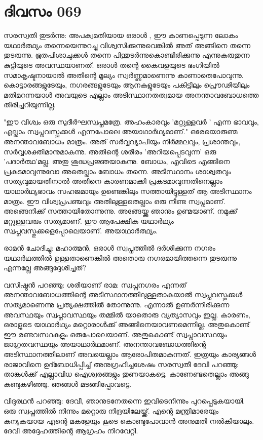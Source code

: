 \newpage
\section{ദിവസം 069}


സരസ്വതി തുടര്‍ന്നു: അപക്വമതിയായ ഒരാള്‍ , ഈ കാണപ്പെടുന്ന ലോകം യഥാര്‍ത്ഥ്യം തന്നെയെന്നുറച്ചു വിശ്വസിക്കുന്നുവെങ്കില്‍ അത്‌ അങ്ങിനെ തന്നെ തുടരുന്നു. ഭൂതപിശാചുക്കൾ തന്നെ പിന്തുടര്‍ന്നുകൊണ്ടിരിക്കുന്നു എന്നുകരുതുന്ന കുട്ടിയുടെ അവസ്ഥയാണത്‌. ഒരാള്‍ തന്റെ കൈവളയുടെ ഭംഗിയില്‍ സമാകൃഷ്ടനായാല്‍ അതിന്റെ മൂല്യം സ്വര്‍ണ്ണമാണെന്നു കാണാതെപോവുന്നു. കൊട്ടാരങ്ങളുടേയും, നഗരങ്ങളുടേയും ആനകളുടേയും പകിട്ടിലും പ്രൌഢിയിലും മതിമറന്നയാള്‍ അവയുടെ എല്ലാം അടിസ്ഥാനതത്വമായ അനന്താവബോധത്തെ തിരിച്ചറിയുന്നില്ല.

"ഈ വിശ്വം ഒരു സുദീര്‍ഘസ്വപ്നമത്രേ. അഹംകാരവും 'മറ്റുള്ളവര്‍ ' എന്ന ഭാവവും, എല്ലാം സ്വപ്നവസ്തുക്കള്‍ എന്നപോലെ അയാഥാര്‍ഥ്യമാണ്‌." ഒരേയൊരുണ്മ അനന്താവബോധം മാത്രം. അത്‌ സര്‍വ്വവ്യാപിയും നിര്‍മ്മലവും, പ്രശാന്തവും, സര്‍വ്വശക്തിമാനുമാകുന്നു. അതിന്റെ ശരീരം 'അറിയപ്പെടവുന്ന' ഒരു 'പദാര്‍ത്ഥ'മല്ല. അതു ശുദ്ധപ്രജ്ഞയാകുന്നു. ബോധം, എവിടെ എങ്ങിനെ  പ്രകടമാവുന്നുവോ അതെല്ലാം ബോധം തന്നെ. അടിസ്ഥാനം ശാശ്വതവും സത്യവുമായതിനാല്‍ അതിനെ കാരണമാക്കി പ്രകടമാവുന്നതിനെല്ലാം യാഥാര്‍ഥ്യഭാവം സഹജമായും ഉണ്ടെങ്കിലും സത്തായിട്ടുള്ളത്‌ ആ അടിസ്ഥാനം മാത്രം. ഈ വിശ്വപ്രപഞ്ചവും അതിലുള്ളതെല്ലാം ഒരു നീണ്ട സ്വപ്നമാണ്‌. അങ്ങെനിക്ക്‌ സത്തായിതോന്നുന്നു. അങ്ങേയ്ക്കു ഞാനും ഉണ്മയാണ്‌. നമുക്ക്‌ മറ്റുള്ളവരും സത്യമാണ്‌. ഈ ആപേക്ഷിക യഥാര്‍ഥ്യം സ്വപ്നവസ്തുക്കളെപ്പോലെയാണ്‌. അയാഥാർത്ഥ്യം.

രാമന്‍ ചോദിച്ചു: മഹാത്മന്‍, ഒരാള്‍ സ്വപ്നത്തില്‍ ദര്‍ശിക്കുന്ന നഗരം യഥാര്‍ഥത്തില്‍ ഉള്ളതാണെങ്കില്‍ അതൊരു നഗരമായിത്തന്നെ തുടരുന്നു എന്നല്ലേ അങ്ങുദ്ദേശിച്ചത്‌?

വസിഷ്ഠന്‍ പറഞ്ഞു: ശരിയാണ്‌ രാമ: സ്വപ്നനഗരം എന്നത്‌ അനന്താവബോധത്തിന്റെ അടിസ്ഥാനത്തിലുള്ളതാകയാല്‍ സ്വപ്നവസ്തുക്കള്‍ സത്യമാണെന്നു പ്രത്യക്ഷത്തില്‍ തോന്നുന്നു. എന്നാല്‍ ഉണര്‍ന്നിരിക്കുന്ന അവസ്ഥയും സ്വപ്നാവസ്ഥയും തമ്മില്‍ യാതൊരു വ്യത്യാസവും ഇല്ല. കാരണം, ഒരാളുടെ യാഥാര്‍ഥ്യം മറ്റൊരാള്‍ക്ക്‌ അങ്ങിനെയാവണമെന്നില്ല. അതുകൊണ്ട്‌ ഈ രണ്ടവസ്ഥകളും ഒരുപോലെയാണ്‌. അതുകൊണ്ട്‌ സ്വപ്നാവസ്ഥയും ജാഗ്രതവസ്ഥയും അയാഥാര്‍ഥമാണ്‌. അനന്താവബോധത്തിന്റെ  അടിസ്ഥാനത്തിലാണ്‌ അവയെല്ലാം ആരോപിതമാകുന്നത്‌. ഇത്രയും കാര്യങ്ങള്‍ രാജാവിനെ ഉദ്ബോധിപ്പിച്ച്‌ അനുഗ്രഹിച്ചശേഷം സരസ്വതീ ദേവി പറഞ്ഞു: താങ്കള്‍ക്ക്‌ എല്ലാവിധ ഐശ്വരങ്ങളും തുണയാകട്ടെ. കാണേണ്ടതെല്ലാം അങ്ങു കണ്ടുകഴിഞ്ഞു. ഞങ്ങൾ മടങ്ങിപ്പോവട്ടെ.

വിദുരഥന്‍ പറഞ്ഞു: ദേവീ, ഞാനുടനേതന്നെ ഇവിടെനിന്നും പുറപ്പെടുകയായി. ഒരു സ്വപ്നത്തില്‍ നിന്നും മറ്റൊരു നിദ്രയിലേയ്ക്ക്‌. എന്റെ മന്ത്രിമാരേയും കന്യകയായ എന്റെ മകളേയും കൂടെ കൊണ്ടുപോവാന്‍ അനുമതി നല്‍കിയാലും. ദേവി അദ്ദേഹത്തിന്റെ ആഗ്രഹം നിറവേറ്റി.
